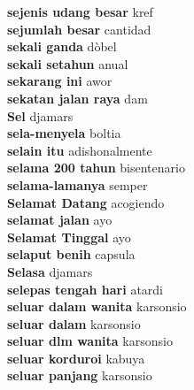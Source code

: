 \textbf{ sejenis udang besar  } kref \\
\textbf{ sejumlah besar  } cantidad \\
\textbf{ sekali ganda  } dòbel \\
\textbf{ sekali setahun  } anual \\
\textbf{ sekarang ini  } awor \\
\textbf{ sekatan jalan raya  } dam \\
\textbf{ Sel  } djamars \\
\textbf{ sela-menyela  } boltia \\
\textbf{ selain itu  } adishonalmente \\
\textbf{ selama 200 tahun  } bisentenario \\
\textbf{ selama-lamanya  } semper \\
\textbf{ Selamat Datang  } acogiendo \\
\textbf{ selamat jalan  } ayo \\
\textbf{ Selamat Tinggal  } ayo \\
\textbf{ selaput benih  } capsula \\
\textbf{ Selasa  } djamars \\
\textbf{ selepas tengah hari  } atardi \\
\textbf{ seluar dalam wanita  } karsonsio \\
\textbf{ seluar dalam  } karsonsio \\
\textbf{ seluar dlm wanita  } karsonsio \\
\textbf{ seluar korduroi  } kabuya \\
\textbf{ seluar panjang  } karsonsio \\
